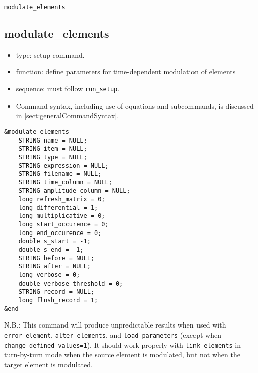 \documentclass[11pt]{article}
\begin{document}
\newpage
\begin{center}{\Large\verb|modulate_elements|}\end{center}
\subsection{modulate\_elements\label{subsec:modulateelements}}

\begin{itemize}
\item type: setup command.
\item function: define parameters for time-dependent modulation of elements
\item sequence: must follow \verb|run_setup|.
\item Command syntax, including use of equations and subcommands, is discussed in \ref{sect:generalCommandSyntax}.
\end{itemize}

\begin{verbatim}
&modulate_elements
    STRING name = NULL;
    STRING item = NULL;
    STRING type = NULL;
    STRING expression = NULL;
    STRING filename = NULL;
    STRING time_column = NULL;
    STRING amplitude_column = NULL;
    long refresh_matrix = 0;
    long differential = 1;
    long multiplicative = 0;
    long start_occurence = 0;
    long end_occurence = 0;
    double s_start = -1;
    double s_end = -1;
    STRING before = NULL;
    STRING after = NULL;
    long verbose = 0;
    double verbose_threshold = 0;
    STRING record = NULL;
    long flush_record = 1;
&end
\end{verbatim}

N.B.: This command will produce unpredictable results when used with
\verb|error_element|, \verb|alter_elements|, and
\verb|load_parameters| (except when \verb|change_defined_values=1|).
It should work properly with \verb|link_elements| in turn-by-turn mode
when the source element is modulated, but not when the target element
is modulated.
\end{document}
